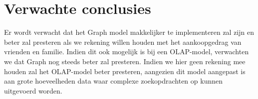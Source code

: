 \section{Verwachte conclusies}
\label{sec:verwachte_conclusies}

Er wordt verwacht dat het Graph model makkelijker te implementeren zal zijn en beter zal presteren als we rekening willen houden met het aankoopgedrag van vrienden en familie. Indien dit ook mogelijk is bij een OLAP-model, verwachten we dat Graph nog steeds beter zal presteren. Indien we hier geen rekening mee houden zal het OLAP-model beter presteren, aangezien dit model aangepast is aan grote hoeveelheden data waar complexe zoekopdrachten op kunnen uitgevoerd worden.


